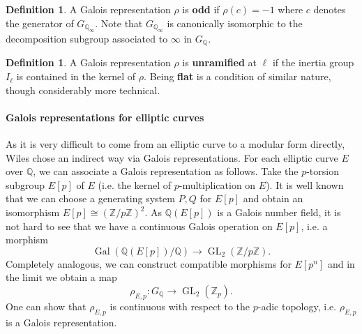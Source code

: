 \documentclass{article}
\theoremstyle{plain}%
\theoremstyle{definition}
\newtheorem{definition}[theorem]{Definition}
\theoremstyle{remark}
\newcommand{\GL}{\operatorname{GL}}
\begin{document}
\begin{definition}
    A Galois representation \(\rho\) is \textbf{odd} if \(\rho(c) = -1\) where \(c\) denotes the generator
    of \(G_{\mathbb{Q}_\infty}\). Note that \(G_{\mathbb{Q}_\infty}\) is canonically isomorphic to
    the decomposition subgroup associated to \(\infty\) in \(G_\mathbb{Q}\).
\end{definition}
\begin{definition}
    A Galois representation \(\rho\) is \textbf{unramified} at \(\ell\) if the inertia group
    \(I_\ell\) is contained in the kernel of \(\rho\).
    Being \textbf{flat} is a condition of similar nature, though considerably more technical.
\end{definition}

\paragraph{Galois representations for elliptic curves}
As it is very difficult to come from an elliptic curve to a modular form directly, 
Wiles chose an indirect way via Galois representations.
For each elliptic curve \(E\) over \(\mathbb{Q}\), we can associate a Galois representation as follows.
Take the \(p\)-torsion subgroup \(E[p]\) of \(E\) (i.e. the kernel of \(p\)-multiplication on \(E\)).
It is well known that we can choose a generating system \(P, Q\) for \(E[p]\) and 
obtain an isomorphism \(E[p] \cong (\mathbb{Z}/p \mathbb{Z})^2\).
As \(\mathbb{Q}(E[p])\) is a Galois number field, it is not hard to see that we have
a continuous Galois operation on \(E[p]\), i.e. a morphism
\[
    \operatorname{Gal}(\mathbb{Q}(E[p])/\mathbb{Q}) \to \GL_2(\mathbb{Z}/p\mathbb{Z}).  
\]
Completely analogous, we can construct compatible morphisms for \(E[p^n]\) 
and in the limit we obtain a map
\[
    \rho_{E, p} \colon G_\mathbb{Q} \to \GL_2(\mathbb{Z}_p).
\]
One can show that \(\rho_{E,p}\) is continuous with respect to the \(p\)-adic topology,
i.e. \(\rho_{E,p}\) is a Galois representation.
\end{document}
